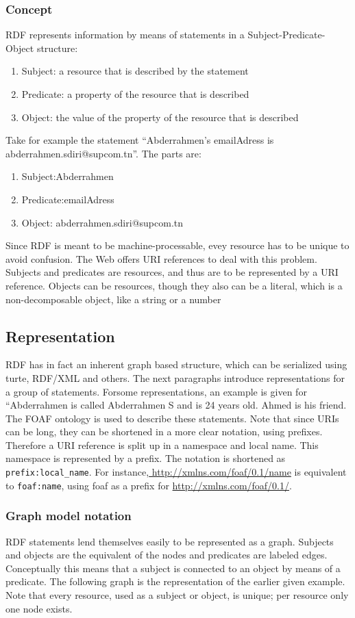 \documentclass[a4paper,12pt,oneside]{report}
\begin{document}
{\subsubsection{Concept}
{RDF represents information by means of statements in a Subject-Predicate-Object structure:
\begin{enumerate}
\item {Subject: a resource that is described by the statement}
\item {Predicate: a property of the resource that is described}
\item {Object: the value of the property of the resource that is described}
\end{enumerate} 
{Take for example the statement “Abderrahmen's emailAdress is abderrahmen.sdiri@supcom.tn”. The parts are:
\begin{enumerate}
\item {Subject:Abderrahmen }
\item {Predicate:emailAdress}
\item {Object: abderrahmen.sdiri@supcom.tn}
\end{enumerate}
{Since RDF is meant to be machine-processable, evey resource has to be unique to avoid confusion. The Web offers URI references to deal with this problem. Subjects and predicates are resources, and thus are to be represented by a URI reference. Objects can be resources, though they also can be a literal, which is a non-decomposable object, like a string or a number}
\subsection{Representation}
{RDF has in fact an inherent graph based structure, which can be serialized using turte, RDF/XML and others. The next paragraphs introduce representations for a group of statements. Forsome representations, an example is given for “Abderrahmen is called Abderrahmen S and is 24 years old. Ahmed is his friend. The FOAF  ontology is used to describe these statements. Note that since URIs can be long, they can be shortened in a more clear notation, using prefixes. Therefore a URI reference is split up in a namespace and local name.
This namespace is represented by a prefix. The notation is shortened as  \verb!prefix:local_name!. For instance,\url{ http://xmlns.com/foaf/0.1/name}  is  equivalent to \verb!foaf:name!, using foaf as a prefix for  \url{http://xmlns.com/foaf/0.1/}.}
\subsubsection{Graph model notation}
{RDF statements lend themselves easily to be represented as a graph. Subjects and objects are the equivalent of the nodes and predicates are labeled edges. Conceptually this means that a subject is connected to an object by means of a predicate. The following graph is the
representation of the earlier given example. Note that every resource, used as a subject or object, is unique; per resource only one node exists.}
}}}
\end{document}
